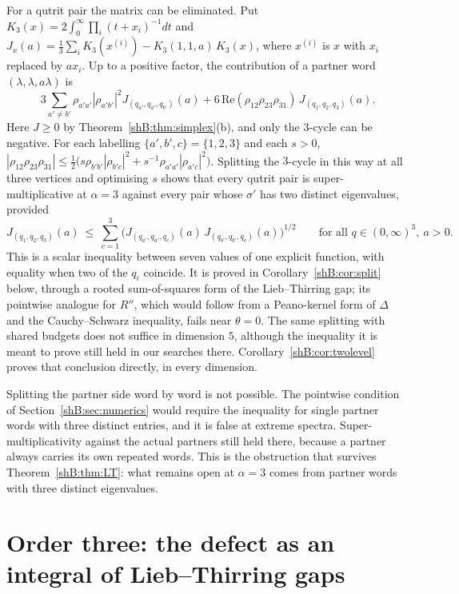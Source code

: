 \begin{remark}
For a qutrit pair the matrix can be eliminated. Put $K_3(x)=2\int_0^\infty\prod_i(t+x_i)^{-1}dt$ and $J_x(a)=\frac13\sum_iK_3(x^{(i)})-K_3(1,1,a)\,K_3(x)$, where $x^{(i)}$ is $x$ with $x_i$ replaced by $ax_i$. Up to a positive factor, the contribution of a partner word $(\lambda,\lambda,a\lambda)$ is
\[
3\sum_{a'\ne b'}\rho_{a'a'}|\rho_{a'b'}|^2J_{(q_{a'},q_{a'},q_{b'})}(a)+6\,\mathrm{Re}(\rho_{12}\rho_{23}\rho_{31})\,J_{(q_1,q_2,q_3)}(a).
\]
Here $J\ge0$ by Theorem~\ref{shB:thm:simplex}(b), and only the $3$-cycle can be negative. For each labelling $\{a',b',c\}=\{1,2,3\}$ and each $s>0$, $|\rho_{12}\rho_{23}\rho_{31}|\le\frac12\big(s\rho_{b'b'}|\rho_{b'c}|^2+s^{-1}\rho_{a'a'}|\rho_{a'c}|^2\big)$. Splitting the $3$-cycle in this way at all three vertices and optimising $s$ shows that every qutrit pair is super-multiplicative at $\alpha=3$ against every pair whose $\sigma'$ has two distinct eigenvalues, provided
\begin{equation}\label{shB:eq:split}
J_{(q_1,q_2,q_3)}(a)\ \le\ \sum_{c=1}^3\Big(J_{(q_{a'},q_{a'},q_c)}(a)\,J_{(q_{b'},q_{b'},q_c)}(a)\Big)^{1/2}\qquad\text{for all }q\in(0,\infty)^3,\ a>0 .
\end{equation}
This is a scalar inequality between seven values of one explicit function, with equality when two of the $q_i$ coincide. It is proved in Corollary~\ref{shB:cor:split} below, through a rooted sum-of-squares form of the Lieb--Thirring gap; its pointwise analogue for $R''$, which would follow from a Peano-kernel form of $\Delta$ and the Cauchy--Schwarz inequality, fails near $\theta=0$. The same splitting with shared budgets does not suffice in dimension $5$, although the inequality it is meant to prove still held in our searches there. Corollary~\ref{shB:cor:twolevel} proves that conclusion directly, in every dimension.

Splitting the partner side word by word is not possible. The pointwise condition of Section~\ref{shB:sec:numerics} would require the inequality for single partner words with three distinct entries, and it is false at extreme spectra. Super-multiplicativity against the actual partners still held there, because a partner always carries its own repeated words. This is the obstruction that survives Theorem~\ref{shB:thm:LT}: what remains open at $\alpha=3$ comes from partner words with three distinct eigenvalues.
\end{remark}

\section{Order three: the defect as an integral of Lieb--Thirring gaps}\label{shB:sec:order3}

